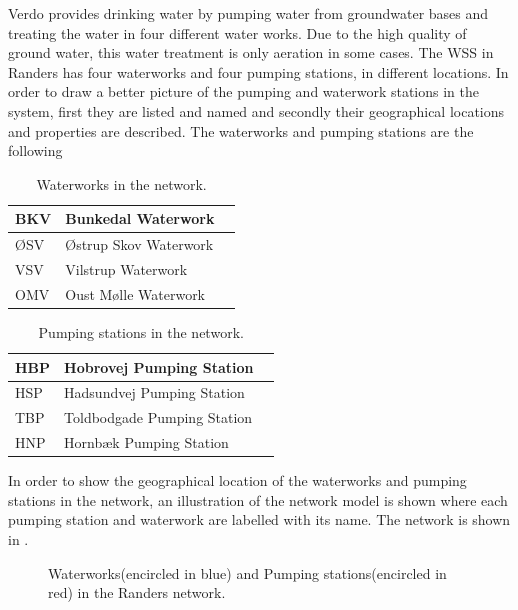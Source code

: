 Verdo provides drinking water by pumping water from groundwater bases and treating the water in four different water works. Due to the high quality of ground water, this water treatment is only aeration in some cases. The WSS in Randers has four waterworks and four pumping stations, in different locations. In order to draw a better picture of the pumping and waterwork stations in the system, first they are listed and named and secondly their geographical locations and properties are described. The waterworks and pumping stations are the following

\begin{table}[H]
\begin{center}
    \begin{tabular}{| l | l | l |}
    \hline
    BKV & Bunkedal Waterwork   \\ \hline
    ØSV & Østrup Skov Waterwork  \\ \hline
    VSV & Vilstrup Waterwork  \\ \hline
    OMV & Oust Mølle Waterwork   \\
    \hline
    \end{tabular}
\end{center}
\caption{Waterworks in the network.}
\end{table}

\begin{table}[H]
\begin{center}
    \begin{tabular}{| l | l | l |}
    \hline
    HBP & Hobrovej Pumping Station   \\ \hline
    HSP & Hadsundvej Pumping Station  \\ \hline
    TBP & Toldbodgade Pumping Station  \\ \hline
    HNP & Hornbæk Pumping Station   \\
    \hline
    \end{tabular}
\end{center}
\caption{Pumping stations in the network.}
\end{table}

In order to show the geographical location of the waterworks and pumping stations in the network, an illustration of the network model is shown where each pumping station and waterwork are labelled with its name. The network is shown in .

\begin{figure}[H]
\centering
 
\caption{Waterworks(encircled in blue) and Pumping stations(encircled in red) in the Randers network.}
\label{fig:pumping_stations_and_waterworks}
\end{figure}

